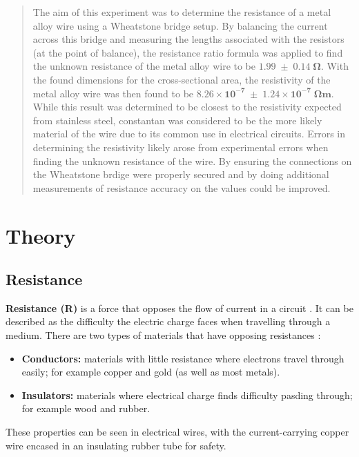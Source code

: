 \documentclass[12pt]{article}
\begin{document}
\setcounter{page}{1}
\tableofcontents

\newpage

\begin{abstract}

The aim of this experiment was to determine the resistance of a metal alloy wire using a Wheatstone bridge setup. By balancing the current across this bridge
and measuring the lengths associated with the resistors (at the point of balance), the resistance ratio formula was applied to find the unknown resistance of the metal alloy wire
to be $\mathbf{1.99 \; \pm \; 0.14 \; \Omega}$. With the found dimensions for the cross-sectional area, the resistivity of the metal alloy wire was then found to be
$\mathbf{8.26 \times 10^{-7} \; \pm \; 1.24 \times 10^{-7} \; \Omega m}$. While this result was determined to be closest to the resistivity expected from stainless steel, constantan
was considered to be the more likely material of the wire due to its common use in electrical circuits. Errors in determining the resistivity likely arose from experimental errors when finding
the unknown resistance of the wire. By ensuring the connections on the Wheatstone brdige were properly secured and by doing additional measurements of resistance accuracy on the values could be improved.

\end{abstract}


\vspace{4cm}

\section{Theory} \label{sec:1}

\subsection{Resistance}

\textbf{Resistance (R)} is a force that opposes the flow of current in a circuit
\cite{flukeresistance,hiokiresistance,britresistance}.
It can be described as the difficulty the electric charge faces when travelling through a medium.
\cite{hiokiresistance}
There are two types of materials that have opposing resistances \cite{flukeresistance}:
\begin{itemize}
    \item \textbf{Conductors:} materials with little resistance where electrons travel through easily; for example copper and gold (as well as most metals).
    \item \textbf{Insulators:} materials where electrical charge finds difficulty pasding through; for example wood and rubber.
\end{itemize}
These properties can be seen in electrical wires, with the current-carrying copper wire encased in an insulating rubber tube for safety.
\end{document}
